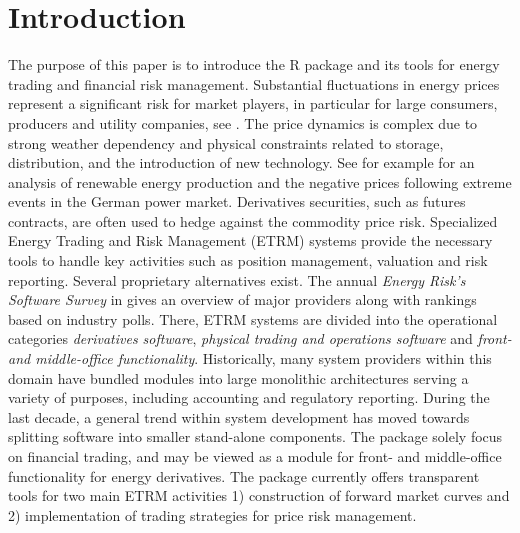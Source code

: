 \section{Introduction}
The purpose of this paper is to introduce the R package  and its tools for energy trading and financial risk management. Substantial fluctuations in energy prices represent a significant risk for market players, in particular for large consumers, producers and utility companies, see \citet{1043596}. The price dynamics is complex due to strong weather dependency and physical constraints related to storage, distribution, and the introduction of new technology. See for example \cite{NICOLOSI20107257} for an analysis of renewable energy production and the negative prices following extreme events in the German power market. Derivatives securities, such as futures contracts, are often used to hedge against the commodity price risk. Specialized Energy Trading and Risk Management (ETRM) systems provide the necessary tools to handle key activities such as position management, valuation and  risk reporting. Several proprietary alternatives exist. The annual \textit{Energy Risk’s Software Survey} in \citet{Tho98w} gives an overview of major providers along with rankings based on industry polls. There, ETRM systems are divided into the operational categories \textit{derivatives software}, \textit{physical trading and operations software} and \textit{front- and middle-office functionality}. Historically, many system providers within this domain have bundled modules into large monolithic architectures serving a variety of purposes, including accounting and regulatory reporting. During the last decade, a general trend within system development has moved towards splitting software into smaller stand-alone components. The  package solely focus on financial trading, and may be viewed as a module for front- and middle-office functionality for energy derivatives. The package currently offers transparent tools for two main ETRM activities 1) construction of forward market curves and 2) implementation of trading strategies for price risk management.

